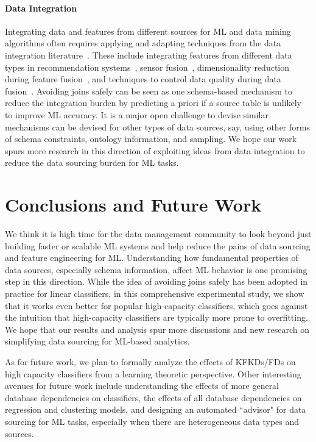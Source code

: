 \documentclass{vldb}
\begin{document}
\paragraph*{Data Integration}
Integrating data and features from different sources for ML and data mining algorithms often requires applying and adapting techniques from
the data integration literature~\cite{diforml,dibook}. These include integrating features from different data types in recommendation 
systems~\cite{multitypefusion}, sensor fusion~\cite{sensorfusion}, dimensionality reduction during feature fusion~\cite{dimredfusion},
and techniques to control data quality during data fusion~\cite{lunabdi}.
Avoiding joins safely can be seen as one schema-based mechanism to reduce the integration burden by predicting a priori if a source table is unlikely 
to improve ML accuracy. It is a major open challenge to devise similar mechanisms can be devised for other types of data sources, say, using other 
forms of schema constraints, ontology information, and sampling. We hope our work spurs more research in this direction of exploiting ideas from data integration 
to reduce the data sourcing burden for ML tasks.




\section{Conclusions and Future Work}
We think it is high time for the data management community to look beyond just building faster 
or scalable ML systems and help reduce the pains of data sourcing and feature engineering for ML. 
Understanding how fundamental properties of data sources, especially schema information, affect 
ML behavior is one promising step in this direction. 
While the idea of avoiding joins safely has been adopted  in practice for 
linear classifiers, in this comprehensive experimental study, we show that it works even better for 
popular high-capacity classifiers, which goes against the intuition that high-capacity classifiers 
are typically more prone to overfitting. We hope that our results and analysis spur more discussions 
and new research on simplifying data sourcing for ML-based analytics.

As for future work, we plan to formally analyze the effects of KFKDs/FDs on high capacity classifiers 
from a learning theoretic perspective. Other interesting avenues for future work include understanding 
the effects of more general database dependencies on classifiers, the effects of all database dependencies 
on regression and clustering models, and designing an automated ``advisor" for data sourcing for ML 
tasks, especially when there are heterogeneous data types and sources.

\pagebreak


\balance

\end{document}
